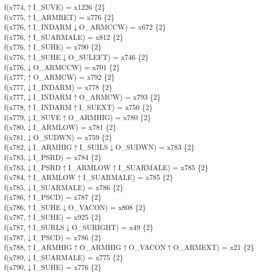 f(x774,$\uparrow$I\_SUVE) = x1226 \{2\} \\  
f(x775,$\uparrow$I\_ARMRET) = x776 \{2\} \\  
f(x776,$\uparrow$I\_INDARM$\downarrow$O\_ARMCCW) = x672 \{2\} \\  
f(x776,$\uparrow$I\_SUARMALE) = x812 \{2\} \\  
f(x776,$\uparrow$I\_SUHE) = x790 \{2\} \\  
f(x776,$\uparrow$I\_SUHE$\downarrow$O\_SULEFT) = x746 \{2\} \\  
f(x776,$\downarrow$O\_ARMCCW) = x701 \{2\} \\  
f(x777,$\uparrow$O\_ARMCW) = x792 \{2\} \\  
f(x777,$\downarrow$I\_INDARM) = x778 \{2\} \\  
f(x777,$\downarrow$I\_INDARM$\uparrow$O\_ARMCW) = x793 \{2\} \\  
f(x778,$\uparrow$I\_INDARM$\uparrow$I\_SUEXT) = x750 \{2\} \\  
f(x779,$\downarrow$I\_SUVE$\uparrow$O\_ARMHIG) = x780 \{2\} \\  
f(x780,$\downarrow$I\_ARMLOW) = x781 \{2\} \\  
f(x781,$\downarrow$O\_SUDWN) = x759 \{2\} \\  
f(x782,$\downarrow$I\_ARMHIG$\uparrow$I\_SUILS$\downarrow$O\_SUDWN) = x783 \{2\} \\  
f(x783,$\downarrow$I\_PSRD) = x784 \{2\} \\  
f(x783,$\downarrow$I\_PSRD$\uparrow$I\_ARMLOW$\uparrow$I\_SUARMALE) = x785 \{2\} \\  
f(x784,$\uparrow$I\_ARMLOW$\uparrow$I\_SUARMALE) = x785 \{2\} \\  
f(x785,$\downarrow$I\_SUARMALE) = x786 \{2\} \\  
f(x786,$\uparrow$I\_PSCD) = x787 \{2\} \\  
f(x786,$\uparrow$I\_SUHE$\downarrow$O\_VACON) = x808 \{2\} \\  
f(x787,$\uparrow$I\_SUHE) = x925 \{2\} \\  
f(x787,$\uparrow$I\_SURLS$\downarrow$O\_SURIGHT) = x49 \{2\} \\  
f(x787,$\downarrow$I\_PSCD) = x786 \{2\} \\  
f(x788,$\uparrow$I\_ARMHIG$\uparrow$O\_ARMHIG$\uparrow$O\_VACON$\uparrow$O\_ARMEXT) = x21 \{2\} \\  
f(x789,$\downarrow$I\_SUARMALE) = x775 \{2\} \\  
f(x790,$\downarrow$I\_SUHE) = x776 \{2\} \\  
